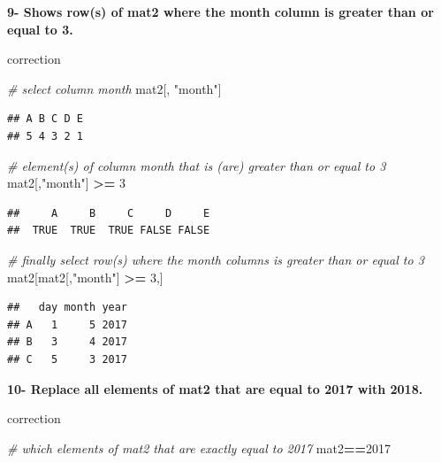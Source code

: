 \documentclass[]{book}
\newenvironment{Shaded}{\begin{snugshade}}{\end{snugshade}}
\newcommand{\CommentTok}[1]{\textcolor[rgb]{0.56,0.35,0.01}{\textit{#1}}}
\newcommand{\DecValTok}[1]{\textcolor[rgb]{0.00,0.00,0.81}{#1}}
\newcommand{\NormalTok}[1]{#1}
\newcommand{\OperatorTok}[1]{\textcolor[rgb]{0.81,0.36,0.00}{\textbf{#1}}}
\newcommand{\StringTok}[1]{\textcolor[rgb]{0.31,0.60,0.02}{#1}}
\begin{document}
\textbf{9- Shows row(s) of mat2 where the month column is greater than or equal to 3.}

correction

\begin{Shaded}
\begin{Highlighting}[]
\CommentTok{# select column month}
\NormalTok{mat2[, }\StringTok{"month"}\NormalTok{]}
\end{Highlighting}
\end{Shaded}

\begin{verbatim}
## A B C D E 
## 5 4 3 2 1
\end{verbatim}

\begin{Shaded}
\begin{Highlighting}[]
\CommentTok{# element(s) of column month that is (are) greater than or equal to 3}
\NormalTok{mat2[,}\StringTok{"month"}\NormalTok{] }\OperatorTok{>=}\StringTok{ }\DecValTok{3}
\end{Highlighting}
\end{Shaded}

\begin{verbatim}
##     A     B     C     D     E 
##  TRUE  TRUE  TRUE FALSE FALSE
\end{verbatim}

\begin{Shaded}
\begin{Highlighting}[]
\CommentTok{# finally select row(s) where the month columns is greater than or equal to 3}
\NormalTok{mat2[mat2[,}\StringTok{"month"}\NormalTok{] }\OperatorTok{>=}\StringTok{ }\DecValTok{3}\NormalTok{,]}
\end{Highlighting}
\end{Shaded}

\begin{verbatim}
##   day month year
## A   1     5 2017
## B   3     4 2017
## C   5     3 2017
\end{verbatim}

\textbf{10- Replace all elements of mat2 that are equal to 2017 with 2018.}

correction

\begin{Shaded}
\begin{Highlighting}[]
\CommentTok{# which elements of mat2 that are exactly equal to 2017}
\NormalTok{mat2}\OperatorTok{==}\DecValTok{2017}
\end{Highlighting}
\end{Shaded}
\end{document}
